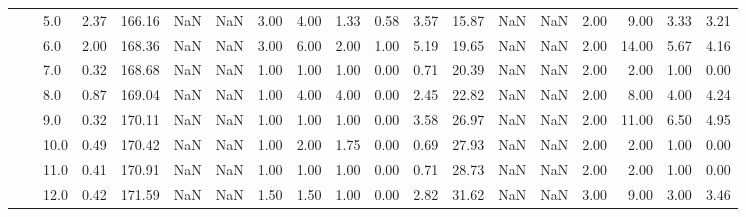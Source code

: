 \begin{tabular}{lllrrrrrrrrrrrrrrrr}
       &     & 5.0  &      2.37 &     166.16 &               NaN &                NaN &  3.00 &   4.00 &             1.33 &                         0.58 &      3.57 &      15.87 &               NaN &                NaN &  2.00 &   9.00 &             3.33 &                         3.21 \\
       &     & 6.0  &      2.00 &     168.36 &               NaN &                NaN &  3.00 &   6.00 &             2.00 &                         1.00 &      5.19 &      19.65 &               NaN &                NaN &  2.00 &  14.00 &             5.67 &                         4.16 \\
       &     & 7.0  &      0.32 &     168.68 &               NaN &                NaN &  1.00 &   1.00 &             1.00 &                         0.00 &      0.71 &      20.39 &               NaN &                NaN &  2.00 &   2.00 &             1.00 &                         0.00 \\
       &     & 8.0  &      0.87 &     169.04 &               NaN &                NaN &  1.00 &   4.00 &             4.00 &                         0.00 &      2.45 &      22.82 &               NaN &                NaN &  2.00 &   8.00 &             4.00 &                         4.24 \\
       &     & 9.0  &      0.32 &     170.11 &               NaN &                NaN &  1.00 &   1.00 &             1.00 &                         0.00 &      3.58 &      26.97 &               NaN &                NaN &  2.00 &  11.00 &             6.50 &                         4.95 \\
       &     & 10.0 &      0.49 &     170.42 &               NaN &                NaN &  1.00 &   2.00 &             1.75 &                         0.00 &      0.69 &      27.93 &               NaN &                NaN &  2.00 &   2.00 &             1.00 &                         0.00 \\
       &     & 11.0 &      0.41 &     170.91 &               NaN &                NaN &  1.00 &   1.00 &             1.00 &                         0.00 &      0.71 &      28.73 &               NaN &                NaN &  2.00 &   2.00 &             1.00 &                         0.00 \\
       &     & 12.0 &      0.42 &     171.59 &               NaN &                NaN &  1.50 &   1.50 &             1.00 &                         0.00 &      2.82 &      31.62 &               NaN &                NaN &  3.00 &   9.00 &             3.00 &                         3.46 \\

\end{tabular}
